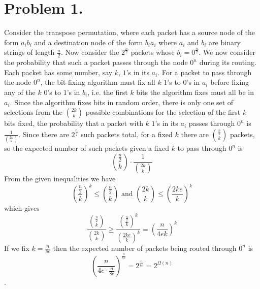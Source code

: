 \documentclass[12pt]{article}
\begin{document}
\pagestyle{plain}
\titleformat{\subsection}[runin]
  {\normalfont\large\bfseries}{\thesubsection}{1em}{}
\titleformat{\subsubsection}[runin]
  {\normalfont\large\bfseries}{\thesubsubsection}{1em}{}

\section*{Problem 1.}
Consider the transpose permutation, where each packet has a source node of
the form $a_ib_i$ and a destination node of the form $b_ia_i$ where $a_i$
and $b_i$ are binary strings of length $\frac{n}{2}$. Now consider the
$2^{\frac{n}{2}}$ packets whose $b_i = 0^{\frac{n}{2}}$. We now consider the
probability that such a packet passes through the node $0^n$ during its routing.
Each packet has some number, say $k$, $1$'s in its $a_i$. For a packet to pass
through the node $0^n$, the bit-fixing algorithm must fix all $k$ $1$'s to
$0$'s in $a_i$ before fixing any of the $k$ $0$'s to $1$'s in $b_i$, i.e. the
first $k$ bits the algorithm fixes must all be in $a_i$. Since the algorithm
fixes bits in random order, there is only one set of selections from the
${2k \choose k}$ possible combinations for the selection of the first $k$ bits
fixed, the probability that a packet with $k$ $1$'s in its $a_i$ passes through
$0^n$ is $\frac{1}{{2k \choose k}}$.
Since there are $2^{\frac{n}{2}}$ such packets total, for a fixed $k$ there are
${\frac{n}{2} \choose k}$ packets, so the expected number of such packets given
a fixed $k$ to pass through $0^n$ is
$${\frac{n}{2} \choose k} \cdot \frac{1}{{2k \choose k}}$$
From the given inequalities we have
$$\left(\frac{\frac{n}{2}}{k}\right)^k \le {\frac{n}{2} \choose k} \text{ and }
{2k \choose k} \le \left(\frac{2ke}{k}\right)^k$$
which gives
$$\frac{{\frac{n}{2} \choose k}}{{2k \choose k}} \ge
\frac{\left(\frac{\frac{n}{2}}{k}\right)^k}{\left(\frac{2ke}{k}\right)^k} =
\left(\frac{n}{4ek}\right)^k$$
If we fix $k = \frac{n}{8e}$ then the expected number of packets being routed
through $0^n$ is
$$\left(\frac{n}{4e\cdot \frac{n}{8e}}\right)^{\frac{n}{8e}} =
2^{\frac{n}{8e}} = 2^{\Omega(n)}$$.
\end{document}
